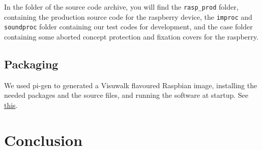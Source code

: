 \documentclass{rapport}
\begin{document}
In the folder of the source code archive, you will find the \verb|rasp_prod| folder, containing the production source code for the raspberry device, the \verb|improc| and \verb|soundproc| folder containing our test codes for development, and the case folder containing some aborted concept protection and fixation covers for the raspberry.

\subsection{Packaging}

We used pi-gen to generated a Visuwalk flavoured Raspbian image, installing the needed packages and the source files, and running the software at startup. See \href{https://github.com/RPi-Distro/pi-gen}{this}.

\section{Conclusion}
\end{document}
